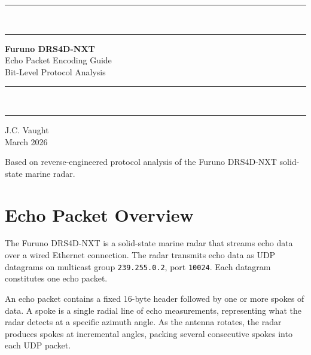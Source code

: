 \documentclass[11pt,letterpaper]{article}
\begin{document}

\begin{titlepage}
\centering
\vspace*{3cm}

{\color{Garnet}\rule{\linewidth}{2pt}}\\[4pt]
{\color{Atlantic}\rule{\linewidth}{0.5pt}}

\vspace{1.5cm}
{\Huge\bfseries\color{Garnet} Furuno DRS4D-NXT}\\[0.8cm]
{\LARGE\color{NinetyBlack} Echo Packet Encoding Guide}\\[0.4cm]
{\large\color{SeventyBlack} Bit-Level Protocol Analysis}

\vspace{1.5cm}
{\color{Atlantic}\rule{\linewidth}{0.5pt}}\\[4pt]
{\color{Garnet}\rule{\linewidth}{2pt}}

\vspace{2cm}
{\large J.C. Vaught}\\[0.3cm]
{\color{SeventyBlack} March 2026}

\vfill
{\small\color{FiftyBlack} Based on reverse-engineered protocol analysis of the Furuno DRS4D-NXT solid-state marine radar.}
\end{titlepage}

\tableofcontents
\clearpage


\section{Echo Packet Overview}
\label{sec:overview}

The Furuno DRS4D-NXT is a solid-state marine radar that streams echo data over a wired Ethernet connection. The radar transmits echo data as UDP datagrams on multicast group \texttt{239.255.0.2}, port \texttt{10024}. Each datagram constitutes one echo packet.

An echo packet contains a fixed 16-byte header followed by one or more spokes of data. A spoke is a single radial line of echo measurements, representing what the radar detects at a specific azimuth angle. As the antenna rotates, the radar produces spokes at incremental angles, packing several consecutive spokes into each UDP packet.
\end{document}
